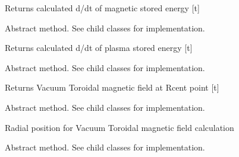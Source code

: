 \documentclass[letterpaper,10pt,english]{sphinxmanual}
\begin{document}
\begin{fulllineitems}
\begin{fulllineitems}
Returns calculated d/dt of magnetic stored energy {[}t{]}

\end{fulllineitems}


\begin{fulllineitems}
\label{\detokenize{eqtools:eqtools.core.Equilibrium.getWpdot}}
Abstract method.  See child classes for implementation.

Returns calculated d/dt of plasma stored energy {[}t{]}

\end{fulllineitems}


\begin{fulllineitems}
\label{\detokenize{eqtools:eqtools.core.Equilibrium.getBCentr}}
Abstract method.  See child classes for implementation.

Returns Vacuum Toroidal magnetic field at Rcent point {[}t{]}

\end{fulllineitems}


\begin{fulllineitems}
\label{\detokenize{eqtools:eqtools.core.Equilibrium.getRCentr}}
Abstract method.  See child classes for implementation.

Radial position for Vacuum Toroidal magnetic field calculation

\end{fulllineitems}


\begin{fulllineitems}
\label{\detokenize{eqtools:eqtools.core.Equilibrium.getEnergy}}
Abstract method.  See child classes for implementation.


\end{fulllineitems}
\end{fulllineitems}
\end{document}
